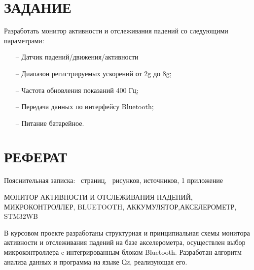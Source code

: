 \begin{sloppypar} %
\newpage %
\section*{ЗАДАНИЕ} %

Разработать монитор активности и отслеживания падений  со следующими параметрами: 
\begin{itemize}
    \item[--]	Датчик падений/движения/активности
    \item[--]	Диапазон регистрируемых ускорений от 2g до 8g;
   \item[--]	Частота обновления показаний 400 Гц;
   \item[--]Передача данных по интерфейсу Bluetooth;
   \item[--]	Питание батарейное.
\end{itemize}

\newpage %
\section*{РЕФЕРАТ} %


Пояснительная записка: \pageref*{LastPage}~страниц, \totfig~рисунков, источников, 1 приложение





МОНИТОР АКТИВНОСТИ И ОТСЛЕЖИВАНИЯ ПАДЕНИЙ, МИКРОКОНТРОЛЛЕР, BLUETOOTH, АККУМУЛЯТОР,АКСЕЛЕРОМЕТР, STM32WB


В курсовом проекте разработаны структурная и принципиальная схемы монитора активности и отслеживания падений на базе акселерометра, осуществлен выбор микроконтроллера c интегрированным блоком Bluetooth.  Разработан алгоритм анализа данных и программа на языке Си, реализующая его.


\end{sloppypar}